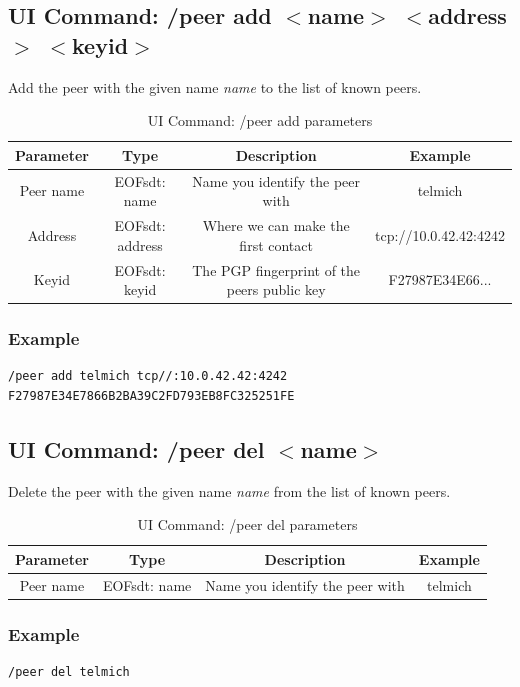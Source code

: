 \subsection{UI Command: /peer add $<$name$>$ $<$address$>$ $<$keyid$>$}
Add the peer with the given name \textit{name} to the list of known peers.

%
\begin{longtable}{|c|c|c|c|}
\caption{UI Command: /peer add parameters}\\
\hline
\textbf{Parameter} & \textbf{Type} & \textbf{Description} & \textbf{Example}\\
\hline
Peer name & EOFsdt: name & Name you identify the peer with & telmich\\
\hline
Address & EOFsdt: address & Where we can make the first contact & tcp://10.0.42.42:4242\\
\hline
Keyid & EOFsdt: keyid & The PGP fingerprint of the peers public key & F27987E34E66...\\
\hline
\end{longtable}

\subsubsection{Example}
\begin{verbatim}
/peer add telmich tcp//:10.0.42.42:4242 F27987E34E7866B2BA39C2FD793EB8FC325251FE
\end{verbatim}
\subsection{UI Command: /peer del $<$name$>$}
Delete the peer with the given name \textit{name} from the list of known peers.

%
\begin{longtable}{|c|c|c|c|}
\caption{UI Command: /peer del parameters}\\
\hline
\textbf{Parameter} & \textbf{Type} & \textbf{Description} & \textbf{Example}\\
\hline
Peer name & EOFsdt: name & Name you identify the peer with & telmich\\
\hline
\end{longtable}

\subsubsection{Example}
\begin{verbatim}
/peer del telmich
\end{verbatim}
